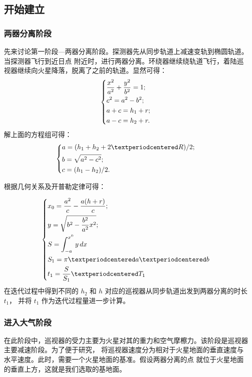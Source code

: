 \documentclass[hyperref,a4paper,UTF8]{ctexart}
\begin{document}
\subsection{开始建立}
\subsubsection{两器分离阶段}
先来讨论第一阶段---两器分离阶段。探测器先从同步轨道上减速变轨到椭圆轨道。当探测器飞行到近日点
附近时，进行两器分离。环绕器继续绕轨道飞行，着陆巡视器继续向火星降落，脱离了之前的轨道。显然可得：
\[
    \begin{dcases}
        \frac{x^2}{a^2} + \frac{y^2}{b^2} = 1 ; \\
        c^2 = a^2 - b^2;                        \\
        a + c = h_1 + r;                        \\
        a - c = h_2 + r.                        \\
    \end{dcases}
\]
解上面的方程组可得：
\[
    \begin{dcases}
        a = (h_1 + h_2 + 2·R) / 2; \\
        b = \sqrt{a^2 - c^2};      \\
        c = (h_1 - h_2) / 2.       \\
    \end{dcases}
\]

\noindent 根据几何关系及开普勒定律可得：

\[
    \begin{dcases}
        x_0 = \frac{a^2}{c} - \frac{a(h + r)}{c}; \\
        y = \sqrt{b^2 - \frac{b^2}{a^2}x^2};      \\
        S = \int_{-a}^{x^0} y \,dx                \\
        S_1 = \pi · a · b                         \\
        t_1 = \frac{S}{S_1} · T_1
    \end{dcases}
\]
在迭代过程中得到不同的 $h_2$ 和 $h$ 对应的巡视器从同步轨道出发到两器分离的时长 $t_1$，
并将 $t_1$ 作为迭代过程量进一步计算。

\subsubsection{进入大气阶段}
在此阶段中，巡视器的受力主要为火星对其的重力和空气摩檫力。该阶段是巡视器主要减速阶段。为了便于研究，
将巡视器速度分为相对于火星地面的垂直速度与水平速度。此时，需要一个火星地面的基准。假设两器分离的点
就位于火星地面的垂直上方，这就是我们选取的基地面。
\end{document}
